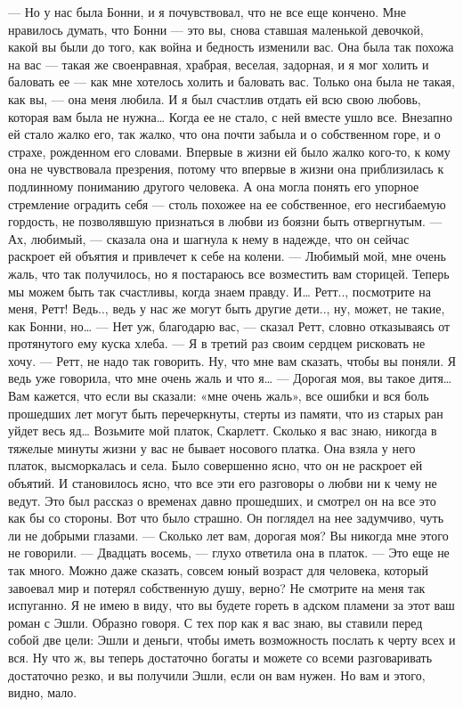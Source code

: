 — Но у нас была Бонни, и я почувствовал, что не все еще кончено. Мне нравилось думать, что Бонни — это вы, снова ставшая маленькой девочкой, какой вы были до того, как война и бедность изменили вас. Она была так похожа на вас — такая же своенравная, храбрая, веселая, задорная, и я мог холить и баловать ее — как мне хотелось холить и баловать вас. Только она была не такая, как вы, — она меня любила. И я был счастлив отдать ей всю свою любовь, которая вам была не нужна… Когда ее не стало, с ней вместе ушло все.
Внезапно ей стало жалко его, так жалко, что она почти забыла и о собственном горе, и о страхе, рожденном его словами. Впервые в жизни ей было жалко кого-то, к кому она не чувствовала презрения, потому что впервые в жизни она приблизилась к подлинному пониманию другого человека. А она могла понять его упорное стремление оградить себя — столь похожее на ее собственное, его несгибаемую гордость, не позволявшую признаться в любви из боязни быть отвергнутым.
— Ах, любимый, — сказала она и шагнула к нему в надежде, что он сейчас раскроет ей объятия и привлечет к себе на колени. — Любимый мой, мне очень жаль, что так получилось, но я постараюсь все возместить вам сторицей. Теперь мы можем быть так счастливы, когда знаем правду. И… Ретт.., посмотрите на меня, Ретт! Ведь.., ведь у нас же могут быть другие дети.., ну, может, не такие, как Бонни, но…
— Нет уж, благодарю вас, — сказал Ретт, словно отказываясь от протянутого ему куска хлеба. — Я в третий раз своим сердцем рисковать не хочу.
— Ретт, не надо так говорить. Ну, что мне вам сказать, чтобы вы поняли. Я ведь уже говорила, что мне очень жаль и что я…
— Дорогая моя, вы такое дитя… Вам кажется, что если вы сказали: «мне очень жаль», все ошибки и вся боль прошедших лет могут быть перечеркнуты, стерты из памяти, что из старых ран уйдет весь яд… Возьмите мой платок, Скарлетт. Сколько я вас знаю, никогда в тяжелые минуты жизни у вас не бывает носового платка.
Она взяла у него платок, высморкалась и села. Было совершенно ясно, что он не раскроет ей объятий. И становилось ясно, что все эти его разговоры о любви ни к чему не ведут. Это был рассказ о временах давно прошедших, и смотрел он на все это как бы со стороны. Вот что было страшно. Он поглядел на нее задумчиво, чуть ли не добрыми глазами.
— Сколько лет вам, дорогая моя? Вы никогда мне этого не говорили.
— Двадцать восемь, — глухо ответила она в платок.
— Это еще не так много. Можно даже сказать, совсем юный возраст для человека, который завоевал мир и потерял собственную душу, верно? Не смотрите на меня так испуганно. Я не имею в виду, что вы будете гореть в адском пламени за этот ваш роман с Эшли. Образно говоря. С тех пор как я вас знаю, вы ставили перед собой две цели: Эшли и деньги, чтобы иметь возможность послать к черту всех и вся. Ну что ж, вы теперь достаточно богаты и можете со всеми разговаривать достаточно резко, и вы получили Эшли, если он вам нужен. Но вам и этого, видно, мало.
